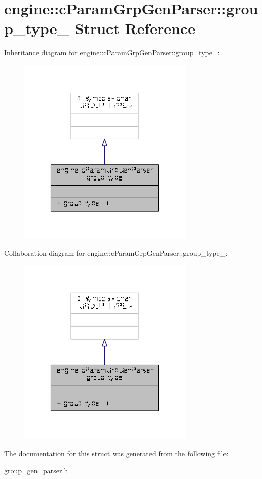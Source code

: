 \hypertarget{structengine_1_1cParamGrpGenParser_1_1group__type__}{\section{engine\-:\-:c\-Param\-Grp\-Gen\-Parser\-:\-:group\-\_\-type\-\_\- Struct Reference}
\label{structengine_1_1cParamGrpGenParser_1_1group__type__}
}


Inheritance diagram for engine\-:\-:c\-Param\-Grp\-Gen\-Parser\-:\-:group\-\_\-type\-\_\-\-:
\nopagebreak
\begin{figure}[H]
\begin{center}
\leavevmode
\includegraphics[width=238pt]{structengine_1_1cParamGrpGenParser_1_1group__type____inherit__graph}
\end{center}
\end{figure}


Collaboration diagram for engine\-:\-:c\-Param\-Grp\-Gen\-Parser\-:\-:group\-\_\-type\-\_\-\-:
\nopagebreak
\begin{figure}[H]
\begin{center}
\leavevmode
\includegraphics[width=238pt]{structengine_1_1cParamGrpGenParser_1_1group__type____coll__graph}
\end{center}
\end{figure}


The documentation for this struct was generated from the following file\-:\begin{DoxyCompactItemize}
\item 
group\-\_\-gen\-\_\-parser.\-h\end{DoxyCompactItemize}
